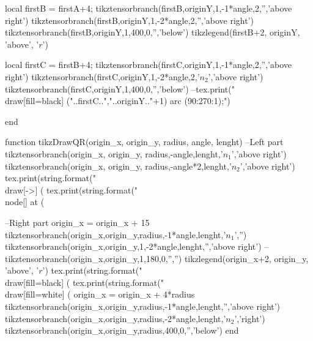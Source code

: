 \begin{luacode*}
          local firstB = firstA+4;
          tikztensorbranch(firstB,originY,1,-1*angle,2,'','above right')
          tikztensorbranch(firstB,originY,1,-2*angle,2,'','above right')
          tikztensorbranch(firstB,originY,1,400,0,'','below')
          tikzlegend(firstB+2, originY, 'above', '$r$')

          local firstC = firstB+4;
          tikztensorbranch(firstC,originY,1,-1*angle,2,'','above right')
          tikztensorbranch(firstC,originY,1,-2*angle,2,'$n_{2}$','above right')
          tikztensorbranch(firstC,originY,1,400,0,'','below')
          --tex.print("\\draw[fill=black] ("..firstC..","..originY.."+1) arc (90:270:1);")

end

function tikzDrawQR(origin_x, origin_y, radius, angle, lenght)
      --Left part
        tikztensorbranch(origin_x, origin_y, radius,-angle,lenght,'$n_{1}$','above right')
        tikztensorbranch(origin_x, origin_y, radius,-angle*2,lenght,'$n_{2}$','above right')
        tex.print(string.format("\\draw[->] (%
        tex.print(string.format("\\node[] at (%
  
      --Right part
        origin_x = origin_x + 15
        tikztensorbranch(origin_x,origin_y,radius,-1*angle,lenght,'$n_{1}$','')
        tikztensorbranch(origin_x,origin_y,1,-2*angle,lenght,'','above right')
        --tikztensorbranch(origin_x,origin_y,1,180,0,'','')
        tikzlegend(origin_x+2, origin_y, 'above', '$r$')
        tex.print(string.format("\\draw[fill=black] (%
        tex.print(string.format("\\draw[fill=white] (%
        origin_x = origin_x + 4*radius
        tikztensorbranch(origin_x,origin_y,radius,-1*angle,lenght,'','above right')
        tikztensorbranch(origin_x,origin_y,radius,-2*angle,lenght,'$n_{2}$','right')
        tikztensorbranch(origin_x,origin_y,radius,400,0,'','below')
    end



\end{luacode*}
